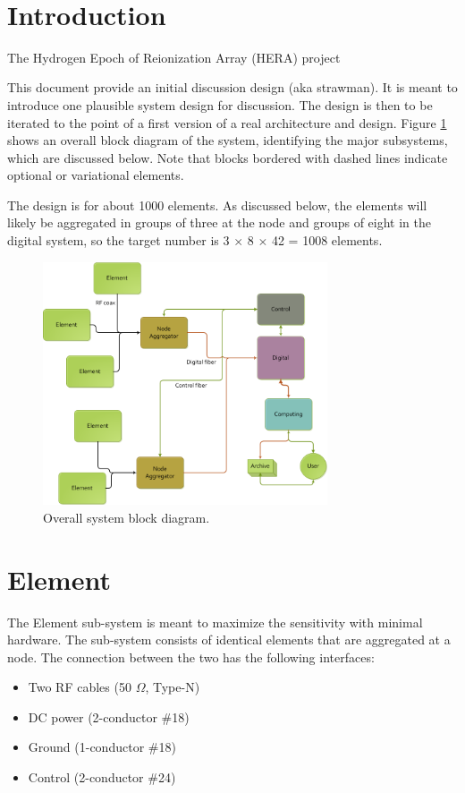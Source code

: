 \documentclass[11pt]{article}
\begin{document}
{ \\}
{
}
\vspace*{0.5cm}


\section{Introduction}
The Hydrogen Epoch of Reionization Array (HERA) project 

This document provide an initial discussion design (aka strawman).  It is meant to introduce one plausible system design for discussion.  The design is then to be iterated to the point of a first version of a real architecture and design.  Figure \ref{fig:overall} shows an overall block diagram of the system, identifying the major subsystems, which are discussed below.  Note that blocks bordered with dashed lines indicate optional or variational elements.

The design is for about 1000 elements.  As discussed below, the elements will likely be aggregated in groups of three at the node and groups of eight in the digital system, so the target number is 3 $\times$ 8 $\times$ 42 = 1008 elements.

\begin{figure}[h]
\centering
\includegraphics[width=0.75\textwidth]{Overall.png}
\caption{Overall system block diagram.}
\label{fig:overall}
\end{figure}

\section{Element}
The Element sub-system is meant to maximize the sensitivity with minimal hardware.  The sub-system consists of identical elements that are aggregated at a node.  The connection between the two has the following interfaces:
\begin{itemize}
\item Two RF cables (50 $\Omega$, Type-N)
\item DC power (2-conductor \#18)
\item Ground (1-conductor \#18)
\item Control (2-conductor \#24)
\end{itemize}
\end{document}
